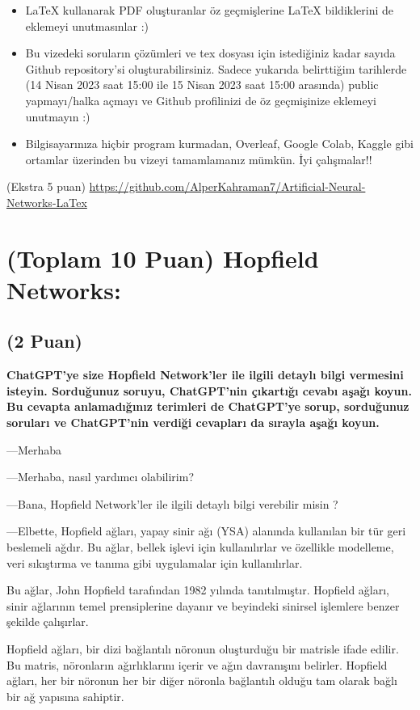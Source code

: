 \documentclass[11pt]{article}
\begin{document}
\begin{itemize}
    \item LaTeX kullanarak PDF oluşturanlar öz geçmişlerine LaTeX bildiklerini de eklemeyi unutmasınlar :)
    \item Bu vizedeki soruların çözümleri ve tex dosyası için istediğiniz kadar sayıda Github repository'si oluşturabilirsiniz. Sadece yukarıda belirttiğim tarihlerde (14 Nisan 2023 saat 15:00 ile 15 Nisan 2023 saat 15:00 arasında) public yapmayı/halka açmayı ve Github profilinizi de öz geçmişinize eklemeyi unutmayın :)
    \item Bilgisayarınıza hiçbir program kurmadan, Overleaf, Google Colab, Kaggle gibi ortamlar üzerinden bu vizeyi tamamlamanız mümkün. İyi çalışmalar!!
\end{itemize}

(Ekstra 5 puan) \url{https://github.com/AlperKahraman7/Artificial-Neural-Networks-LaTex}

\newpage
\section{(Toplam 10 Puan) Hopfield Networks:}

\subsection{(2 Puan)} \textbf{ChatGPT’ye size Hopfield Network’ler ile ilgili detaylı bilgi vermesini isteyin. Sorduğunuz soruyu, ChatGPT'nin çıkartığı cevabı aşağı koyun. Bu cevapta anlamadığınız terimleri de ChatGPT’ye sorup, sorduğunuz soruları ve ChatGPT’nin verdiği cevapları da sırayla aşağı koyun.}

---Merhaba

---Merhaba, nasıl yardımcı olabilirim?

---Bana, Hopfield Network'ler ile ilgili detaylı bilgi verebilir misin ?

---Elbette, Hopfield ağları, yapay sinir ağı (YSA) alanında kullanılan bir tür geri beslemeli ağdır. Bu ağlar, bellek işlevi için kullanılırlar ve özellikle modelleme, veri sıkıştırma ve tanıma gibi uygulamalar için kullanılırlar.

Bu ağlar, John Hopfield tarafından 1982 yılında tanıtılmıştır. Hopfield ağları, sinir ağlarının temel prensiplerine dayanır ve beyindeki sinirsel işlemlere benzer şekilde çalışırlar.

Hopfield ağları, bir dizi bağlantılı nöronun oluşturduğu bir matrisle ifade edilir. Bu matris, nöronların ağırlıklarını içerir ve ağın davranışını belirler. Hopfield ağları, her bir nöronun her bir diğer nöronla bağlantılı olduğu tam olarak bağlı bir ağ yapısına sahiptir.
\end{document}
